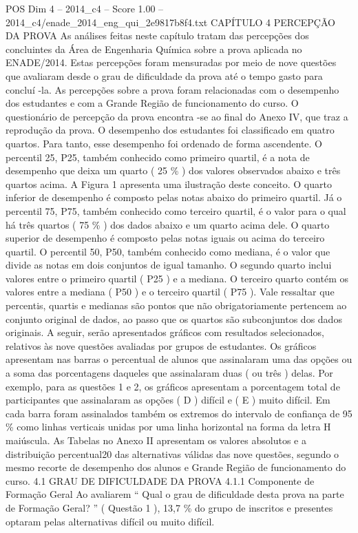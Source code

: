 \begin{textsample}{POS Dim 4 – 2014\_c4 – Score 1.00 – 2014\_c4/enade\_2014\_eng\_qui\_2e9817b8f4.txt}  \label{ex:f4_pos_202}
CAPÍTULO 4 PERCEPÇÃO DA PROVA As análises feitas neste capítulo tratam das percepções dos concluintes da Área de Engenharia Química sobre a prova aplicada no ENADE/2014.
Estas percepções foram mensuradas por meio de nove questões que avaliaram desde o grau de dificuldade da prova até o tempo gasto para concluí -la.
As percepções sobre a prova foram relacionadas com o desempenho dos estudantes e com a Grande Região de funcionamento do curso.
O questionário de percepção da prova encontra -se ao final do Anexo IV, que traz a reprodução da prova.
O desempenho dos estudantes foi classificado em quatro quartos.
Para tanto, esse desempenho foi ordenado de forma ascendente.
O percentil 25, P25, também conhecido como primeiro quartil, é a nota de desempenho que deixa um quarto ( 25 \% ) dos valores observados abaixo e três quartos acima.
A Figura 1 apresenta uma ilustração deste conceito.
O quarto inferior de desempenho é composto pelas notas abaixo do primeiro quartil.
Já o percentil 75, P75, também conhecido como terceiro quartil, é o valor para o qual há três quartos ( 75 \% ) dos dados abaixo e um quarto acima dele.
O quarto superior de desempenho é composto pelas notas iguais ou acima do terceiro quartil.
O percentil 50, P50, também conhecido como mediana, é o valor que divide as notas em dois conjuntos de igual tamanho.
O segundo quarto inclui valores entre o primeiro quartil ( P25 ) e a mediana.
O terceiro quarto contém os valores entre a mediana ( P50 ) e o terceiro quartil ( P75 ).
Vale ressaltar que percentis, quartis e medianas são pontos que não obrigatoriamente pertencem ao conjunto original de dados, ao passo que os quartos são subconjuntos dos dados originais.
A seguir, serão apresentados gráficos com resultados selecionados, relativos às nove questões avaliadas por grupos de estudantes.
Os gráficos apresentam nas barras o percentual de alunos que assinalaram uma das opções ou a soma das porcentagens daqueles que assinalaram duas ( ou três ) delas.
Por exemplo, para as questões 1 e 2, os gráficos apresentam a porcentagem total de participantes que assinalaram as opções ( D ) difícil e ( E ) muito difícil.
Em cada barra foram assinalados também os extremos do intervalo de confiança de 95 \% como linhas verticais unidas por uma linha horizontal na forma da letra H maiúscula.
As Tabelas no Anexo II apresentam os valores absolutos e a distribuição percentual20 das alternativas válidas das nove questões, segundo o mesmo recorte de desempenho dos alunos e Grande Região de funcionamento do curso. 4.1 GRAU DE DIFICULDADE DA PROVA 4.1.1 Componente de Formação Geral Ao avaliarem “ Qual o grau de dificuldade desta prova na parte de Formação Geral? ” ( Questão 1 ), 13,7 \% do grupo de inscritos e presentes optaram pelas alternativas difícil ou muito difícil.

\end{textsample}
